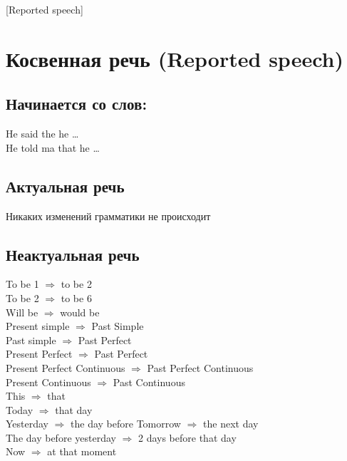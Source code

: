 [Reported speech]

\section{Косвенная речь (Reported speech)}
\subsection{Начинается со слов:}
\p
He said the he \dots \\
He told ma that he \dots \\

\subsection{Актуальная речь}
\p
Никаких изменений грамматики не происходит \\

\subsection{Неактуальная речь}
\p
To be 1 $\Rightarrow$ to be 2\\
To be 2 $\Rightarrow$ to be 6\\
Will be $\Rightarrow$ would be\\
Present simple $\Rightarrow$ Past Simple\\
Past simple $\Rightarrow$ Past Perfect\\
Present Perfect $\Rightarrow$ Past Perfect\\
Present Perfect Continuous $\Rightarrow$ Past Perfect Continuous\\
Present Continuous $\Rightarrow$ Past Continuous\\
This $\Rightarrow$ that\\
Today $\Rightarrow$ that day\\
Yesterday $\Rightarrow$ the day before
Tomorrow $\Rightarrow$ the next day\\
The day before yesterday $\Rightarrow$ 2 days before that day\\
Now $\Rightarrow$ at that moment

